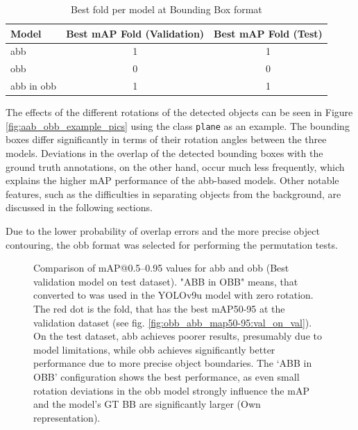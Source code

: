 \begin{table}[h]
\centering
\begin{tabular}{l c c}
\hline
\textbf{Model} & \textbf{Best mAP Fold (Validation)} & \textbf{Best mAP Fold (Test)} \\ 
\hline
abb &  1 & 1 \\
obb &  0 & 0 \\
abb in obb &  1 & 1 \\
\hline
\end{tabular}
\caption{Best fold per model at Bounding Box format}
\label{tab:best_folds_area}
\end{table}


The effects of the different rotations of the detected objects can be seen in Figure \ref{fig:aab_obb_example_pics} using the class \texttt{plane} as an example. The bounding boxes differ significantly in terms of their rotation angles between the three models. Deviations in the overlap of the detected bounding boxes with the ground truth annotations, on the other hand, occur much less frequently, which explains the higher \acrshort{mAP} performance of the \acrshort{abb}-based models. Other notable features, such as the difficulties in separating objects from the background, are discussed in the following sections.

Due to the lower probability of overlap errors and the more precise object contouring, the \acrshort{obb} format was selected for performing the permutation tests.


\begin{figure}[htbp]
    \centering
    
    \caption[Comparison of \acrshort{mAP}@0.5--0.95 values for \acrshort{abb} and \acrshort{obb} (Best validation model on test dataset)]{Comparison of \acrshort{mAP}@0.5--0.95 values for \acrshort{abb} and \acrshort{obb} (Best validation model on test dataset). "ABB in OBB" means, that  converted to  was used in the \acrshort{YOLO}v9u model with zero rotation. The red dot is the fold, that has the best \acrshort{mAP}50-95 at the validation dataset (see fig. \ref{fig:obb_abb_map50-95:val_on_val}).  On the test dataset, \acrshort{abb} achieves poorer results, presumably due to model limitations, while \acrshort{obb} achieves significantly better performance due to more precise object boundaries. The ‘ABB in OBB’ configuration shows the best performance, as even small rotation deviations in the \acrshort{obb} model strongly influence the \acrshort{mAP} and the model's \acrshort{GT} \acrshort{BB} are significantly larger (Own representation). }
    \label{fig:obb_abb_map50-95:val_on_test}
\end{figure}

